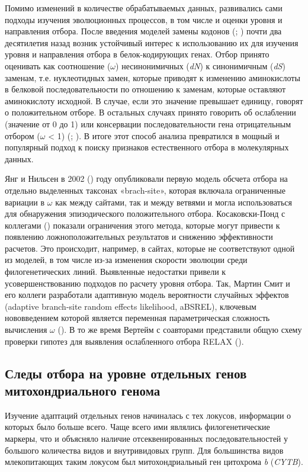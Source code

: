 Помимо изменений в количестве обрабатываемых данных, развивались сами подходы изучения эволюционных процессов, в том числе и оценки уровня и направления отбора. После введения моделей замены кодонов (\cite{Goldman1994}; \cite{Muse1994}) почти два десятилетия назад возник устойчивый интерес к использованию их для изучения уровня и направления отбора в белок-кодирующих генах. Отбор принято оценивать как соотношение ($\omega$) несинонимичных (\textit{dN}) к синонимичным (\textit{dS}) заменам, т.е. нуклеотидных замен, которые приводят к изменению аминокислоты в белковой последовательности по отношению к заменам, которые оставляют аминокислоту исходной. В случае, если это значение превышает единицу, говорят о положительном отборе. В остальных случаях принято говорить об ослаблении (значение от 0 до 1) или консервации последовательности гена отрицательным отбором ($\omega$ < 1) (\cite{Anisimova2009}; \cite{Delport2008}). В итоге этот способ анализа превратился в мощный и популярный подход к поиску признаков естественного отбора в молекулярных данных. 

Янг и Нильсен в 2002 (\cite{Yang2002}) году опубликовали первую модель обсчета отбора на отдельно выделенных таксонах «brach-site», которая включала ограниченные вариации в $\omega$ как между сайтами, так и между ветвями и могла использоваться для обнаружения эпизодического положительного отбора. Косаковски-Понд с коллегами (\cite{KosakovskyPond2011}) показали ограничения этого метода, которые могут привести к появлению ложноположительных результатов и снижению эффективности расчетов. Это происходит, например, в сайтах, которые не соответствуют одной из моделей, в том числе из-за изменения скорости эволюции среди филогенетических линий. Выявленные недостатки привели к усовершенствованию подходов по расчету уровня отбора. Так, Мартин Смит и его коллеги разработали адаптивную модель вероятности случайных эффектов (adaptive branch-site random effects likelihood, aBSREL), ключевым нововведением которой является переменная параметрическая сложность вычисления $\omega$ (\cite{Smith2015}). В то же время Вертейм с соавторами представили общую схему проверки гипотез для выявления ослабленного отбора RELAX (\cite{Wertheim2015}). 

\subsection{Следы отбора на уровне отдельных генов митохондриального генома}

Изучение адаптаций отдельных генов начиналась с тех локусов, информации о которых было больше всего. Чаще всего ими являлись филогенетические маркеры, что и объясняло наличие отсеквенированных последовательностей у большого количества видов и внутривидовых групп.  Для большинства видов млекопитающих таким локусом был митохондриальный ген цитохрома \textit{b} (\textit{CYTB}).

